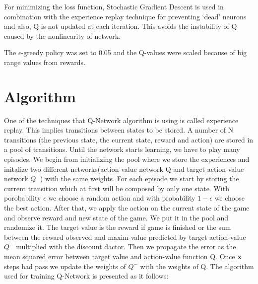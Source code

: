 For minimizing the loss function, Stochastic Gradient Descent is used in combination with the experience replay technique for preventing `dead' neurons and also, Q is not updated at each iteration. This avoids the instability of Q caused by the nonlinearity of network.

The $\epsilon$-greedy policy was set to 0.05 and the Q-values were scaled because of big range values from rewards.
\newpage
\section{Algorithm}

One of the techniques that Q-Network algorithm is using is called experience replay. This implies transitions between states to be stored. A number of N transitions (the previous state, the current state, reward and action) are stored in a pool of transitions. Until the network starts learning, we have to play many episodes. We begin from initializing the pool where we store the experiences and initalize two different networks(action-value network Q and target action-value network $Q^-$) with the same weights. For each episode we start by storing the current transition which at first will be composed by only one state. With porobability $\epsilon$ we choose a random action and with probability $1-\epsilon$ we choose the best action. After that, we apply the action on the current state of the game and observe reward and new state of the game. We put it in the pool and randomize it. The target value is the reward if game is finished or the sum between the reward observed and maxim-value predicted by target action-value $Q^-$ multiplied with the discount dactor. Then we propagate the error as the mean squared error between target value and action-value function Q. Once \textbf{x} steps had pass we update the weights of $Q^-$ with the weights of Q. The algorithm\cite{atari} used for training Q-Network is presented as it follows:

